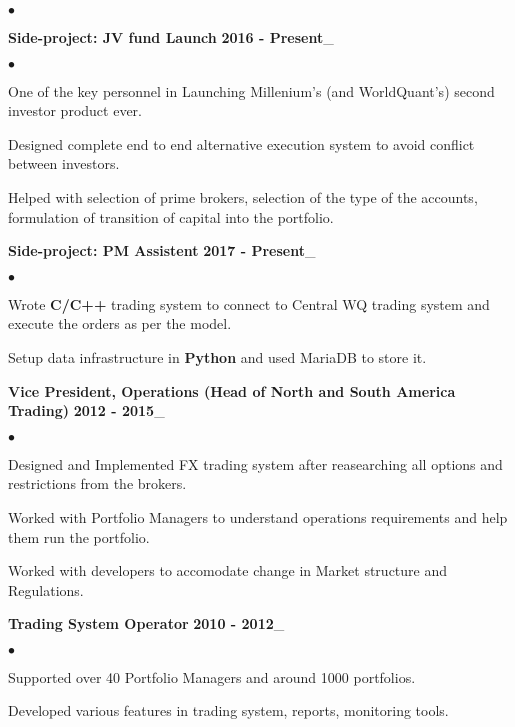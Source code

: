 \documentclass[margin,line]{res}
\newenvironment{list2}{
  \begin{list}{$\bullet$}{%
      \setlength{\itemsep}{0.05in}
      \setlength{\parsep}{0in} \setlength{\parskip}{0in}
      \setlength{\topsep}{-0.1in} \setlength{\partopsep}{0in}
      \setlength{\leftmargin}{0.2in}}}{\end{list}}
\begin{document}
\begin{resume}
\begin{list2}
\end{list2}

{\bf Side-project: JV fund Launch} \hfill {\bf 2016 - Present}\_
\begin{list2}
\item One of the key personnel in Launching Millenium's (and WorldQuant's) second investor product ever.
\item Designed complete end to end alternative execution system to avoid conflict between investors.
\item Helped with selection of prime brokers, selection of the type of the accounts, formulation of transition of capital into the portfolio.
\end{list2}

{\bf Side-project: PM Assistent} \hfill {\bf 2017 - Present}\_
\begin{list2}
\item Wrote {\bf C/C++} trading system to connect to Central WQ trading system and execute the orders as per the model.
\item Setup data infrastructure in {\bf Python} and used MariaDB to store it.
\end{list2}

{\bf Vice President, Operations (Head of North and South America Trading)} \hfill {\bf 2012 - 2015}\_
\begin{list2}
\item Designed and Implemented FX trading system after reasearching all options and restrictions from the brokers.
\item Worked with Portfolio Managers to understand operations requirements and help them run the portfolio.
\item Worked with developers to accomodate change in Market structure and Regulations.
\end{list2}

{\bf Trading System Operator} \hfill {\bf 2010 - 2012}\_
\begin{list2}
\item Supported over 40 Portfolio Managers and around 1000 portfolios.
\item Developed various features in trading system, reports, monitoring tools.
\end{list2}


\end{resume}
\end{document}
